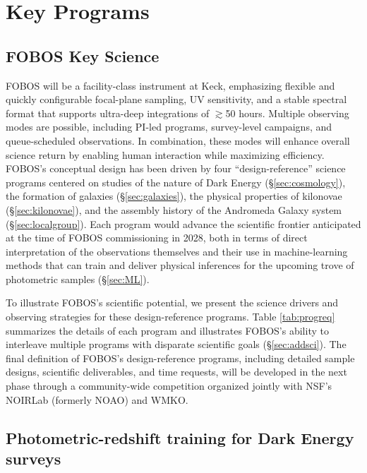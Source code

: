 \documentclass[11pt,a4paper,twoside,onecolumn,openany,final,oldfontcommands]{memoir}
\begin{document}
\newpage

\chapter{Key Programs}

\section{FOBOS Key Science}


FOBOS will be a facility-class instrument at Keck, emphasizing flexible and quickly configurable focal-plane sampling, UV sensitivity, and a stable spectral format that supports ultra-deep integrations of $\gtrsim$50 hours.  Multiple observing modes are possible, including PI-led programs, survey-level campaigns, and queue-scheduled observations.  In combination, these modes will enhance overall science return by enabling human interaction while maximizing efficiency.  FOBOS's conceptual design has been driven by four ``design-reference'' science programs centered on studies of the nature of Dark Energy (\S \ref{sec:cosmology}), the formation of galaxies (\S \ref{sec:galaxies}), the physical properties of kilonovae (\S \ref{sec:kilonovae}), and the assembly history of the Andromeda Galaxy system (\S \ref{sec:localgroup}).  Each program would advance the scientific frontier anticipated at the time of FOBOS commissioning in 2028, both in terms of direct interpretation of the observations themselves and their use in machine-learning methods that can train and deliver physical inferences for the upcoming trove of photometric samples (\S \ref{sec:ML}).

To illustrate FOBOS's scientific potential, we present the science drivers and observing strategies for these design-reference programs.  Table \ref{tab:progreq} summarizes the details of each program and illustrates FOBOS's ability to interleave multiple programs with disparate scientific goals (\S \ref{sec:addsci}).  The final definition of FOBOS's design-reference programs, including detailed sample designs, scientific deliverables, and time requests, will be developed in the next phase through a community-wide competition organized jointly with NSF's NOIRLab (formerly NOAO) and WMKO.

\section{Photometric-redshift training for Dark Energy surveys}
\label{sec:photozs}
\end{document}
